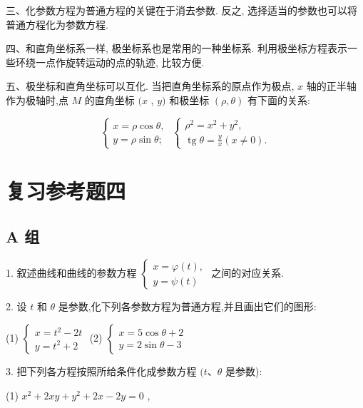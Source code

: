 \documentclass[lang=cn,newtx,12pt,scheme=chinese]{elegantbook}
\begin{document}
三、化参数方程为普通方程的关键在于消去参数. 反之, 选择适当的参数也可以将普通方程化为参数方程.

四、和直角坐标系一样, 极坐标系也是常用的一种坐标系. 利用极坐标方程表示一些环绕一点作旋转运动的点的轨迹, 比较方便.

五、极坐标和直角坐标可以互化. 当把直角坐标系的原点作为极点, \(x\) 轴的正半轴作为极轴时,点 \(M\) 的直角坐标 \((x\) , \(y)\) 和极坐标 \(\left( {\rho ,\theta }\right)\) 有下面的关系:

\[
  \left\{ {\begin{array}{l} x = \rho \cos \theta , \\ y = \rho \sin \theta ; \end{array}\;\left\{ \begin{array}{l} {\rho }^{2} = {x}^{2} + {y}^{2}, \\ \operatorname{tg}\theta = \frac{y}{x}\left( {x \neq 0}\right) . \end{array}\right. }\right.
\]

\chapter*{复习参考题四}

\section*{A 组}

1. 叙述曲线和曲线的参数方程 \(\left\{ \begin{array}{l} x = \varphi \left( t\right) , \\ y = \psi \left( t\right) \end{array}\right.\) 之间的对应关系.

2. 设 \(t\) 和 \(\theta\) 是参数,化下列各参数方程为普通方程,并且画出它们的图形:

(1) \(\left\{ \begin{array}{l} x = {t}^{2} - {2t} \\ y = {t}^{2} + 2 \end{array}\right.\) (2) \(\left\{ \begin{array}{l} x = 5\cos \theta + 2 \\ y = 2\sin \theta - 3 \end{array}\right.\)

3. 把下列各方程按照所给条件化成参数方程 \((t\text{、}\theta\) 是参数):

(1) \({x}^{2} + {2xy} + {y}^{2} + {2x} - {2y} = 0\) ,
\end{document}
